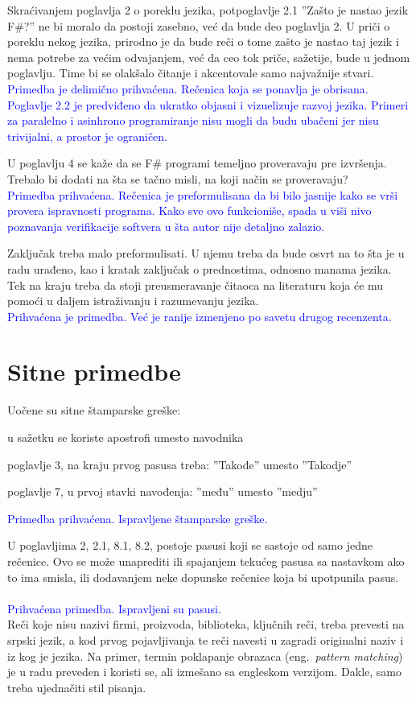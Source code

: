 \documentclass[a4paper]{report}
\newcommand{\odgovor}[1]{\textcolor{blue}{#1}}
\begin{document}
Skraćivanjem poglavlja 2 o poreklu jezika, potpoglavlje 2.1 ''Zašto je nastao jezik F\#?'' ne bi moralo da postoji zasebno, već da bude deo poglavlja 2.
U priči o poreklu nekog jezika, prirodno je da bude reči o tome zašto je nastao taj jezik i nema potrebe za većim odvajanjem, već da ceo tok priče, sažetije, 
bude u jednom poglavlju. Time bi se olakšalo čitanje i akcentovale samo najvažnije stvari.
\\ \odgovor {Primedba je delimično prihvaćena. Rečenica koja se ponavlja je obrisana. Poglavlje 2.2 je predviđeno da ukratko objasni i vizuelizuje razvoj jezika. Primeri za paralelno i asinhrono programiranje nisu mogli da budu ubačeni jer nisu trivijalni, a prostor je ograničen.}

U poglavlju 4 se kaže da se F\# programi temeljno proveravaju pre izvršenja.
Trebalo bi dodati na šta se tačno misli, na koji način se proveravaju?
\\ \odgovor {Primedba prihvaćena. Rečenica je preformulisana da bi bilo jasnije kako se vrši provera ispravnosti programa. Kako sve ovo funkcioniše, spada u viši nivo poznavanja verifikacije softvera u šta autor nije detaljno zalazio.}

Zaključak treba malo preformulisati. U njemu treba da bude osvrt na to šta je u radu
urađeno, kao i kratak zaključak o prednostima, odnosno manama jezika. Tek na kraju
treba da stoji preusmeravanje čitaoca na literaturu koja će mu pomoći u daljem 
istraživanju i razumevanju jezika. 
\\ \odgovor {Prihvaćena je primedba. Već je ranije izmenjeno po savetu drugog recenzenta.}

\section{Sitne primedbe}

Uočene su sitne štamparske greške:
\begin{list}{•}{}
\item u sažetku se koriste apostrofi umesto navodnika
\item poglavlje 3, na kraju prvog pasusa treba: ''Takođe'' umesto ''Takodje''
\item poglavlje 7, u prvoj stavki navođenja: ''među'' umesto ''medju''
\end{list}
\odgovor {Primedba prihvaćena. Ispravljene štamparske greške.}  

U poglavljima 2, 2.1, 8.1, 8.2, postoje pasusi koji se sastoje od samo jedne rečenice.
Ovo se može unaprediti ili spajanjem tekućeg pasusa sa nastavkom ako to ima smisla,
ili dodavanjem neke dopunske rečenice koja bi upotpunila pasus.\\
\\ \odgovor {Prihvaćena primedba. Ispravljeni su pasusi.}
\\ \odgovor {}
Reči koje nisu nazivi firmi, proizvoda, biblioteka, ključnih reči,
treba prevesti na srpski jezik, 
a kod prvog pojavljivanja te reči navesti u zagradi originalni naziv i iz kog je jezika. 
Na primer, termin poklapanje obrazaca (eng.~{\em pattern matching}) 
je u radu preveden i koristi se, ali izmešano sa engleskom verzijom. 
Dakle, samo treba ujednačiti stil pisanja.
\end{document}
